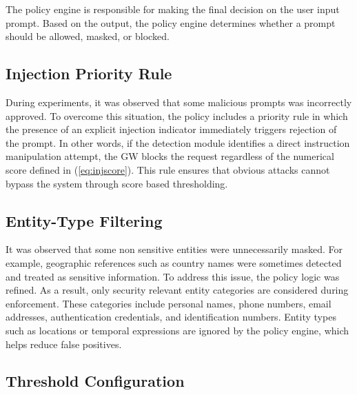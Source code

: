 \documentclass[conference]{IEEEtran}
\begin{document}
The policy engine is responsible for making the final decision on the user input prompt. Based on the output, the policy engine determines whether a prompt should be allowed, masked, or blocked. %

\subsection{Injection Priority Rule}


During experiments, it was observed that some malicious prompts was incorrectly approved. To overcome this situation, the policy includes a priority rule in which the presence of an explicit injection indicator immediately triggers rejection of the prompt. In other words, if the detection module identifies a direct instruction manipulation attempt, the GW blocks the request regardless of the numerical score defined in (\ref{eq:injscore}). This rule ensures that obvious attacks cannot bypass the system through score based thresholding.

\subsection{Entity-Type Filtering}

It was observed that some non sensitive entities were unnecessarily masked. For example, geographic references such as country names were sometimes detected and treated as sensitive information. To address this issue, the policy logic was refined. As a result, only security relevant entity categories are considered during enforcement. These categories include personal names, phone numbers, email addresses, authentication credentials, and identification numbers. Entity types such as locations or temporal expressions are ignored by the policy engine, which helps reduce false positives.

\subsection{Threshold Configuration}
\end{document}
